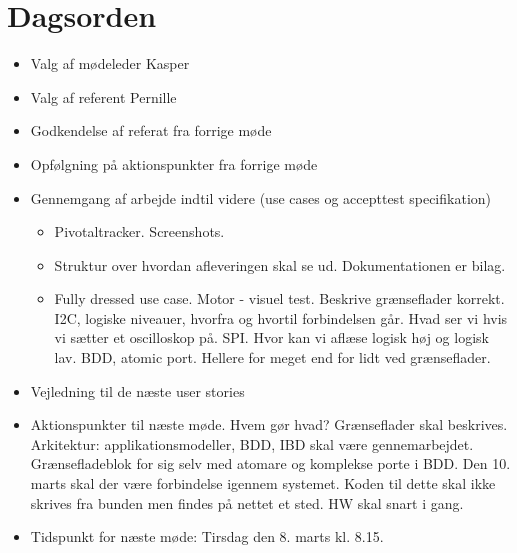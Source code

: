 \documentclass{article}
\begin{document}
	\section{Dagsorden}
	\begin{itemize}
		\item Valg af mødeleder
		\subitem Kasper
		\item Valg af referent
		\subitem Pernille
		\item Godkendelse af referat fra forrige møde 
		\item Opfølgning på aktionspunkter fra forrige møde
		\item Gennemgang af arbejde indtil videre (use cases og accepttest specifikation)
		\begin{itemize}
			\item Pivotaltracker. Screenshots. 
			\item Struktur over hvordan afleveringen skal se ud. Dokumentationen er bilag. 
			\item Fully dressed use case. 
			\subitem Motor - visuel test. 
			\subitem Beskrive grænseflader korrekt. 
			\subitem I2C, logiske niveauer, hvorfra og hvortil forbindelsen går. Hvad ser vi hvis vi sætter et oscilloskop på. SPI. Hvor kan vi aflæse logisk høj og logisk lav. 
			\subitem BDD, atomic port. 
			\subitem Hellere for meget end for lidt ved grænseflader. 
		\end{itemize}
		\item Vejledning til de næste user stories
		\item Aktionspunkter til næste møde. Hvem gør hvad? 
		\subitem Grænseflader skal beskrives.
		\subitem Arkitektur: applikationsmodeller, BDD, IBD skal være gennemarbejdet. Grænsefladeblok for sig selv med atomare og komplekse porte i BDD. 
		\subitem Den 10. marts skal der være forbindelse igennem systemet. Koden til dette skal ikke skrives fra bunden men findes på nettet et sted. HW skal snart i gang. 
		\item Tidspunkt for næste møde: 
		\subitem Tirsdag den 8. marts kl. 8.15. 
	\end{itemize}
\end{document}
